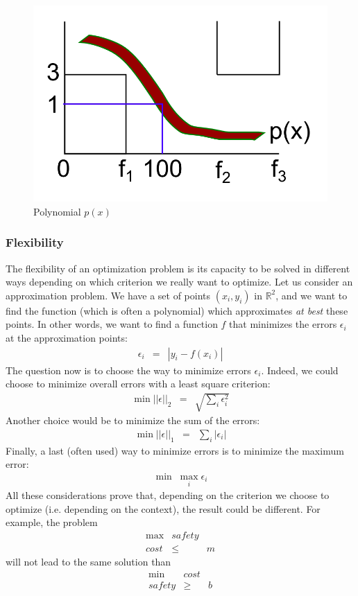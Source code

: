 \documentclass{article}
\begin{document}
\begin{figure}[ht!]
\centering
\includegraphics[scale=0.4]{poly.png}
\caption{Polynomial $p(x)$}
\label{poly}
\end{figure}

\subsubsection{Flexibility}
The flexibility of an optimization problem is its capacity to be solved in different ways depending on which criterion we really want to optimize. Let us consider an approximation problem. We have a set of points $(x_i,y_i)$ in $\mathbb{R}^2$, and we want to find the function (which is often a polynomial) which approximates \textit{at best} these points. In other words, we want to find a function $f$ that minimizes the errors $\epsilon _i$ at the approximation points:
\begin{eqnarray*}
\epsilon_i &=& |y_i - f(x_i)|
\end{eqnarray*}
The question now is to choose the way to minimize errors $\epsilon _i$. Indeed, we could choose to minimize overall errors with a least square criterion: 
\begin{eqnarray*}
\min ||\epsilon||_2 &=& \sqrt{\sum_i{\epsilon_i^2}}
\end{eqnarray*}
Another choice would be to minimize the sum of the errors:
\begin{eqnarray*}
\min ||\epsilon||_1 &=& \sum_i{|\epsilon_i|}
\end{eqnarray*}
Finally, a last (often used) way to minimize errors is to minimize the maximum error: 
\begin{eqnarray*}
\min\;\max_i \epsilon_i
\end{eqnarray*}
All these considerations prove that, depending on the criterion we choose to optimize (i.e. depending on the context), the result could be different. For example, the problem
\begin{eqnarray*}
\max &safety&\\
cost &\le& m
\end{eqnarray*}
will not lead to the same solution than
\begin{eqnarray*}
\min &cost&\\
safety &\ge& b
\end{eqnarray*}
\end{document}
